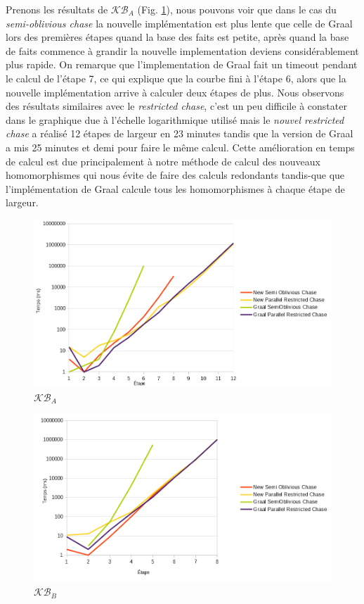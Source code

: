 Prenons les résultats de $\mathcal{KB}_A$ (Fig. \ref{fig:ex0oldnew}), nous pouvons voir que dans le cas du \textit{semi-oblivious chase} la nouvelle implémentation est plus lente que celle de Graal lors des premières étapes quand la base des faits est petite, après quand la base de faits commence à grandir la nouvelle implementation deviens considérablement plus rapide. On remarque que l'implementation de Graal fait un timeout pendant le calcul de l'étape 7, ce qui explique que la courbe fini à l'étape 6, alors que la nouvelle implémentation arrive à calculer deux étapes de plus. Nous observons des résultats similaires avec le \textit{restricted chase}, c'est un peu difficile à constater dans le graphique due à l'échelle logarithmique utilisé mais le \textit{nouvel restricted chase} a réalisé 12 étapes de largeur en 23 minutes tandis que la version de Graal a mis 25 minutes et demi pour faire le même calcul. Cette amélioration en temps de calcul est due principalement à notre méthode de calcul des nouveaux homomorphismes qui nous évite de faire des calculs redondants tandis-que que l'implémentation de Graal calcule tous les homomorphismes à chaque étape de largeur.

\begin{figure}
\centering
\includegraphics[width=\textwidth]{pictures/benchmark_old-new/ex0oldnew.png}
\caption{$\mathcal{KB}_A$ }
\label{fig:ex0oldnew}
\end{figure}

\begin{figure}
\centering
\includegraphics[width=\textwidth]{pictures/benchmark_old-new/ex1oldnew.png}
\caption{$\mathcal{KB}_B$}
\label{fig:ex1oldnew}
\end{figure}

